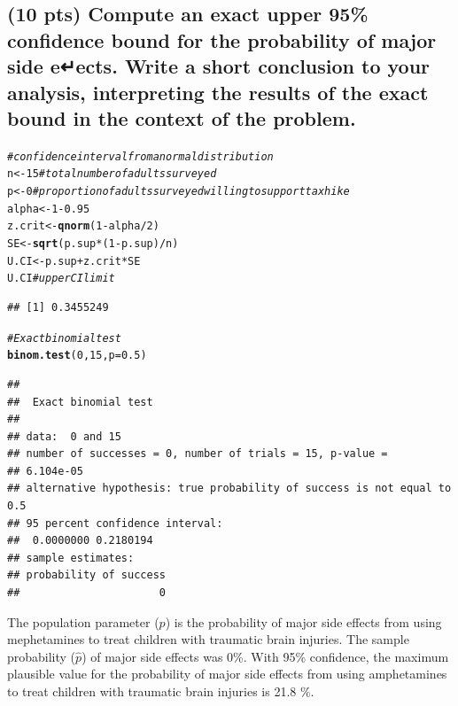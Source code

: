 \documentclass{article}\usepackage[]{graphicx}\usepackage[]{color}
\makeatletter
\newcommand{\hlnum}[1]{\textcolor[rgb]{0.686,0.059,0.569}{#1}}%
\newcommand{\hlcom}[1]{\textcolor[rgb]{0.678,0.584,0.686}{\textit{#1}}}%
\newcommand{\hlopt}[1]{\textcolor[rgb]{0,0,0}{#1}}%
\newcommand{\hlstd}[1]{\textcolor[rgb]{0.345,0.345,0.345}{#1}}%
\newcommand{\hlkwb}[1]{\textcolor[rgb]{0.69,0.353,0.396}{#1}}%
\newcommand{\hlkwc}[1]{\textcolor[rgb]{0.333,0.667,0.333}{#1}}%
\newcommand{\hlkwd}[1]{\textcolor[rgb]{0.737,0.353,0.396}{\textbf{#1}}}%
\newenvironment{kframe}{%
 \def\at@end@of@kframe{}%
 \ifinner\ifhmode%
  \def\at@end@of@kframe{\end{minipage}}%
  \begin{minipage}{\columnwidth}%
 \fi\fi%
 \def\FrameCommand##1{\hskip\@totalleftmargin \hskip-\fboxsep
 \colorbox{shadecolor}{##1}\hskip-\fboxsep
     \hskip-\linewidth \hskip-\@totalleftmargin \hskip\columnwidth}%
 \MakeFramed {\advance\hsize-\width
   \@totalleftmargin\z@ \linewidth\hsize
   \@setminipage}}%
 {\par\unskip\endMakeFramed%
 \at@end@of@kframe}
\newenvironment{knitrout}{}{} %
\makeatother
\begin{document}
\subsection{(10 pts) Compute an exact upper 95\% confidence bound for the probability of major side e↵ects. Write a short conclusion to your analysis, interpreting the results of the exact bound in the context of the problem.}

\begin{knitrout}
\color{fgcolor}\begin{kframe}
\begin{alltt}
\hlcom{# confidence interval from a normal distribution}
\hlstd{n} \hlkwb{<-} \hlnum{15}       \hlcom{# total number of adults surveyed}
\hlstd{p} \hlkwb{<-} \hlnum{0}     \hlcom{# proportion of adults surveyed willing to support tax hike}
\hlstd{alpha} \hlkwb{<-} \hlnum{1} \hlopt{-} \hlnum{0.95}
\hlstd{z.crit} \hlkwb{<-} \hlkwd{qnorm}\hlstd{(}\hlnum{1} \hlopt{-} \hlstd{alpha}\hlopt{/}\hlnum{2}\hlstd{)}
\hlstd{SE} \hlkwb{<-} \hlkwd{sqrt}\hlstd{(p.sup}\hlopt{*}\hlstd{(}\hlnum{1} \hlopt{-} \hlstd{p.sup)}\hlopt{/}\hlstd{n)}
\hlstd{U.CI} \hlkwb{<-} \hlstd{p.sup} \hlopt{+} \hlstd{z.crit} \hlopt{*} \hlstd{SE}
\hlstd{U.CI} \hlcom{# upper CI limit}
\end{alltt}
\begin{verbatim}
## [1] 0.3455249
\end{verbatim}
\begin{alltt}
\hlcom{# Exact binomial test}
\hlkwd{binom.test}\hlstd{(}\hlnum{0}\hlstd{,} \hlnum{15}\hlstd{,} \hlkwc{p} \hlstd{=} \hlnum{0.5}\hlstd{)}
\end{alltt}
\begin{verbatim}
## 
## 	Exact binomial test
## 
## data:  0 and 15
## number of successes = 0, number of trials = 15, p-value =
## 6.104e-05
## alternative hypothesis: true probability of success is not equal to 0.5
## 95 percent confidence interval:
##  0.0000000 0.2180194
## sample estimates:
## probability of success 
##                      0
\end{verbatim}
\end{kframe}
\end{knitrout}

The population parameter ($p$) is the probability of major side effects from using mephetamines to treat children with traumatic brain injuries.  The sample probability ($\hat{p}$) of major side effects was 0\%.  With 95\% confidence, the maximum plausible value for the probability of major side effects from using amphetamines to treat children with traumatic brain injuries is 21.8 \%.
\end{document}
